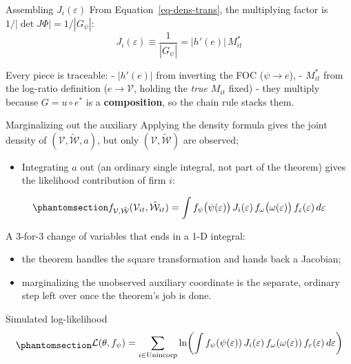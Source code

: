 \documentclass[
  ignorenonframetext,
  aspectratio=169,
]{beamer}
\providecommand{\tightlist}{%
  \setlength{\itemsep}{0pt}\setlength{\parskip}{0pt}}
\begin{document}
\begin{frame}{Assembling \(J_i(\varepsilon)\)}
\protect{}\label{assembling-j_ivarepsilon}
From Equation~\ref{eq-dens-trans}, the multiplying factor is
\(1/|\det J\Phi|=1/|G_\psi|\): \[
J_i(\varepsilon)\equiv\frac{1}{|G_\psi|}=\big|h'(e)\big|\,M^*_{it}
\]

Every piece is traceable: - \(|h'(e)|\) from inverting the FOC
(\(\psi\to e\)), - \(M^*_{it}\) from the log-ratio definition
(\(e\to\mathcal V\), holding the \emph{true} \(M_{it}\) fixed) - they
multiply because \(G=u\circ e^*\) is a \textbf{composition}, so the
chain rule stacks them.
\end{frame}

\begin{frame}{Marginalizing out the auxiliary}
\protect{}\label{marginalizing-out-the-auxiliary}
Applying the density formula gives the joint density of
\((\mathcal V,\tilde{\mathcal W},a)\), but only
\((\mathcal V,\tilde{\mathcal W})\) are observed;

\begin{itemize}
\tightlist
\item
  Integrating \(a\) out (an ordinary single integral, not part of the
  theorem) gives the likelihood contribution of firm \(i\):
\end{itemize}

\begin{equation}\protect\phantomsection\label{eq-Lunc}{
f_{\mathcal V,\tilde{\mathcal W}}(\mathcal V_{it},\tilde{\mathcal W}_{it})=\int f_\psi\big(\psi(\varepsilon)\big)\,J_i(\varepsilon)\,f_\omega\big(\omega(\varepsilon)\big)\,f_\varepsilon(\varepsilon)\,d\varepsilon
}\end{equation}

A 3-for-3 change of variables that ends in a 1-D integral:

\begin{itemize}
\tightlist
\item
  the theorem handles the square transformation and hands back a
  Jacobian;
\item
  marginalizing the unobserved auxiliary coordinate is the separate,
  ordinary step left over once the theorem's job is done.
\end{itemize}
\end{frame}

\begin{frame}{Simulated log-likelihood}
\protect{}\label{simulated-log-likelihood}
\begin{equation}\protect\phantomsection\label{eq-loglik}{
\begin{aligned}
\mathcal L(\theta,f_\psi)=\sum_{i\in\text{Unincorp}}\ln\!\left(\int f_\psi(\psi(\varepsilon))\,J_i(\varepsilon)\,f_\omega(\omega(\varepsilon))\,f_\varepsilon(\varepsilon)\,d\varepsilon\right)
\end{aligned}
}\end{equation}
\end{frame}
\end{document}
